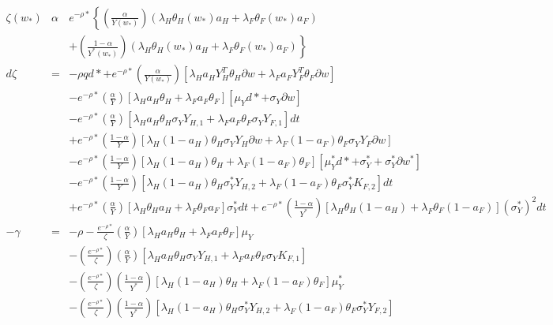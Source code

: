 \documentclass[]{article}
\begin{document}
\begin{eqnarray*}
\zeta(w_*) &\alpha & e^{-\rho*} \left\{\left(\frac{\alpha}{Y(w_*)}\right) \left(\lambda_H\theta_H(w_*)a_H + \lambda_F \theta_F (w_*) a_F\right) \right.\\
&&+ \left.\left(\frac{1-\alpha}{Y^*(w_*)}\right)\left(\lambda_H\theta_H(w_*)a_H + \lambda_F \theta_F (w_*) a_F\right)\right\}\\
d\zeta &=& -\rho qd* + e^{-\rho *} \left(\frac{\alpha}{Y(w_*)}\right) \left[\lambda_H a_H Y_H^T \theta_H \partial w + \lambda_F a_F Y_F^T \theta_F \partial w\right]\\
&& - e^{-\rho *} \left(\frac{\alpha}{Y}\right) \left[\lambda_H a_H \theta_H + \lambda_F a_F \theta_F \right] \left[\mu_Y d* + \sigma_Y \partial w\right]\\
&& - e^{-\rho *} \left(\frac{\alpha}{Y}\right) \left[\lambda_H a_H \theta_H \sigma_Y Y_{H,1} + \lambda_F a_F \theta_F \sigma_Y Y_{F,1} \right]dt\\
&& + e^{-\rho *} \left(\frac{1-\alpha}{Y}\right) \left[\lambda_H (1-a_H) \theta_H \sigma_Y Y_H \partial w + \lambda_F (1-a_F) \theta_F \sigma_Y Y_F \partial w \right]\\
&& - e^{-\rho *} \left(\frac{1-\alpha}{Y}\right) \left[\lambda_H (1-a_H) \theta_H + \lambda_F (1-a_F) \theta_F \right] \left[\mu_Y^* d* + \sigma_Y^* + \sigma_Y^* \partial w^*\right]\\
&& - e^{-\rho *} \left(\frac{1-\alpha}{Y}\right) \left[\lambda_H (1-a_H) \theta_H \sigma_Y^* Y_{H,2} + \lambda_F (1-a_F) \theta_F \sigma_Y^* K_{F,2} \right]dt\\
&& + e^{-\rho *} \left(\frac{\alpha}{Y}\right) \left[\lambda_H \theta_H a_H + \lambda_F \theta_F a_F \right]\sigma_Y^* dt + e^{-\rho *} \left(\frac{1-\alpha}{Y^*}\right) \left[\lambda_H \theta_H (1-a_H) + \lambda_F \theta_F (1-a_F) \right](\sigma_Y^*)^2 dt\\ 
-\gamma &=& -\rho -\frac{e^{-\rho *}}{\zeta} \left(\frac{\alpha}{Y}\right) \left[\lambda_H a_H \theta_H + \lambda_F a_F \theta_F \right] \mu_Y\\
&& - \left(\frac{e^{-\rho *}}{\zeta}\right)\left(\frac{\alpha}{Y}\right) \left[\lambda_H a_H \theta_H \sigma_Y Y_{H,1}+ \lambda_F a_F \theta_F \sigma_Y K_{F,1}\right]\\
&& - \left(\frac{e^{-\rho *}}{\zeta}\right)\left(\frac{1-\alpha}{Y^*}\right) \left[\lambda_H (1-a_H) \theta_H + \lambda_F (1-a_F) \theta_F \right] \mu_Y^*\\
&& - \left(\frac{e^{-\rho *}}{\zeta}\right)\left(\frac{1-\alpha}{Y^*}\right) \left[\lambda_H (1-a_H) \theta_H \sigma_Y^* Y_{H,2}+ \lambda_F (1-a_F) \theta_F \sigma_Y^*Y_{F,2}\right]\\

\end{eqnarray*}
\end{document}

